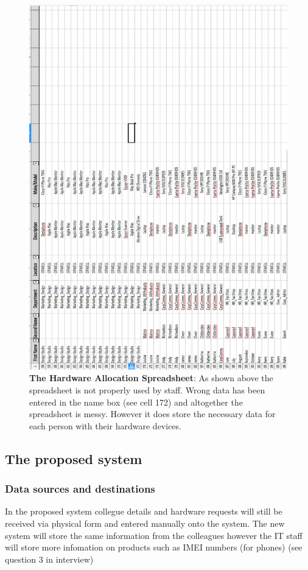 \begin{figure}[H]
\includegraphics[width=.9\textwidth,height=.9\textheight,keepaspectratio]{Spreadsheet.jpg}
\caption{\textbf{The Hardware Allocation Spreadsheet}: As shown above the spreadsheet is not properly used by staff. Wrong data has been entered in the name box (see cell 172) and altogether the spreadsheet is messy. However it does store the necessary data for each person with their hardware devices.} \label{Spreadsheet}
\end{figure}


\subsection{The proposed system}

\subsubsection{Data sources and destinations}

In the proposed system collegue details and hardware requests will still be received via physical form and entered manually onto the system. The new system will store the same information from the colleagues however the IT staff will store more infomation on products such as IMEI numbers (for phones) (see question 3 in interview)

